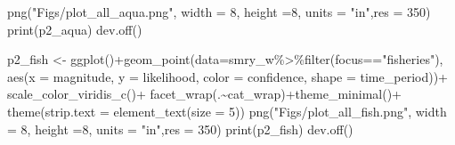 \documentclass[
]{article}
\newenvironment{Shaded}{\begin{snugshade}}{\end{snugshade}}
\newcommand{\AttributeTok}[1]{\textcolor[rgb]{0.77,0.63,0.00}{#1}}
\newcommand{\DecValTok}[1]{\textcolor[rgb]{0.00,0.00,0.81}{#1}}
\newcommand{\FunctionTok}[1]{\textcolor[rgb]{0.00,0.00,0.00}{#1}}
\newcommand{\NormalTok}[1]{#1}
\newcommand{\OtherTok}[1]{\textcolor[rgb]{0.56,0.35,0.01}{#1}}
\newcommand{\SpecialCharTok}[1]{\textcolor[rgb]{0.00,0.00,0.00}{#1}}
\newcommand{\StringTok}[1]{\textcolor[rgb]{0.31,0.60,0.02}{#1}}
\begin{document}
\begin{Shaded}
\begin{Highlighting}[]
    \FunctionTok{png}\NormalTok{(}\StringTok{"Figs/plot\_all\_aqua.png"}\NormalTok{, }
        \AttributeTok{width =} \DecValTok{8}\NormalTok{, }\AttributeTok{height =}\DecValTok{8}\NormalTok{, }\AttributeTok{units =} \StringTok{"in"}\NormalTok{,}\AttributeTok{res =} \DecValTok{350}\NormalTok{)}
    \FunctionTok{print}\NormalTok{(p2\_aqua)}
    \FunctionTok{dev.off}\NormalTok{()}
    
\NormalTok{    p2\_fish }\OtherTok{\textless{}{-}} \FunctionTok{ggplot}\NormalTok{()}\SpecialCharTok{+}\FunctionTok{geom\_point}\NormalTok{(}\AttributeTok{data=}\NormalTok{smry\_w}\SpecialCharTok{\%\textgreater{}\%}\FunctionTok{filter}\NormalTok{(focus}\SpecialCharTok{==}\StringTok{"fisheries"}\NormalTok{),}
                            \FunctionTok{aes}\NormalTok{(}\AttributeTok{x     =}\NormalTok{ magnitude,}
                                \AttributeTok{y     =}\NormalTok{ likelihood,}
                                \AttributeTok{color =}\NormalTok{ confidence,}
                                \AttributeTok{shape =}\NormalTok{ time\_period))}\SpecialCharTok{+}
      \FunctionTok{scale\_color\_viridis\_c}\NormalTok{()}\SpecialCharTok{+}
      \FunctionTok{facet\_wrap}\NormalTok{(.}\SpecialCharTok{\textasciitilde{}}\NormalTok{cat\_wrap)}\SpecialCharTok{+}\FunctionTok{theme\_minimal}\NormalTok{()}\SpecialCharTok{+}
      \FunctionTok{theme}\NormalTok{(}\AttributeTok{strip.text =} \FunctionTok{element\_text}\NormalTok{(}\AttributeTok{size =} \DecValTok{5}\NormalTok{))}
    \FunctionTok{png}\NormalTok{(}\StringTok{"Figs/plot\_all\_fish.png"}\NormalTok{, }
        \AttributeTok{width =} \DecValTok{8}\NormalTok{, }\AttributeTok{height =}\DecValTok{8}\NormalTok{, }\AttributeTok{units =} \StringTok{"in"}\NormalTok{,}\AttributeTok{res =} \DecValTok{350}\NormalTok{)}
    \FunctionTok{print}\NormalTok{(p2\_fish)}
    \FunctionTok{dev.off}\NormalTok{()}


\end{Highlighting}
\end{Shaded}
\end{document}
